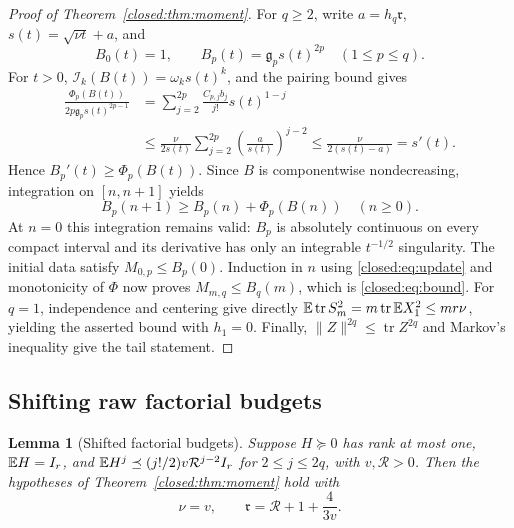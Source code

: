 \documentclass[11pt,a4paper]{article}
\newtheorem{lemma}[theorem]{Lemma}
\theoremstyle{definition}\newtheorem{definition}[theorem]{Definition}
\theoremstyle{remark}\newtheorem{remark}[theorem]{Remark}
\numberwithin{equation}{section}
\newcommand{\gmom}{\mathfrak g}
\newcommand{\Rmom}{\mathfrak r}
\DeclareMathOperator{\tr}{tr}\DeclareMathOperator{\rank}{rank}
\begin{document}
\begin{proof}[Proof of Theorem~\ref{closed:thm:moment}]
For $q\ge2$, write $a=h_q\Rmom$, $s(t)=\sqrt{\nu t}+a$, and
\[
 B_0(t)=1,\qquad B_p(t)=\gmom_ps(t)^{2p}\quad(1\le p\le q).
\]
For $t>0$, $\mathcal I_k(B(t))=\omega_ks(t)^k$, and the pairing
bound gives
\begin{align*}
 \frac{\Phi_p(B(t))}{2p\gmom_ps(t)^{2p-1}}
 &=\sum_{j=2}^{2p}\frac{C_{p,j}b_j}{j!}s(t)^{1-j}\\
 &\le\frac\nu{2s(t)}\sum_{j=2}^{2p}
                       \left(\frac a{s(t)}\right)^{j-2}
 \le\frac\nu{2(s(t)-a)}=s'(t).
\end{align*}
Hence $B_p'(t)\ge\Phi_p(B(t))$. Since $B$ is componentwise
nondecreasing, integration on $[n,n+1]$ yields
\[
 B_p(n+1)\ge B_p(n)+\Phi_p(B(n))\quad(n\ge0).
\]
At $n=0$ this integration remains valid: $B_p$ is absolutely
continuous on every compact interval and its derivative has only an
integrable $t^{-1/2}$ singularity. The initial data satisfy
$M_{0,p}\le B_p(0)$. Induction in $n$ using
\eqref{closed:eq:update} and monotonicity of $\Phi$ now proves
$M_{m,q}\le B_q(m)$, which is \eqref{closed:eq:bound}.
For $q=1$, independence and centering give directly
$\E\tr S_m^2=m\tr\E X_1^2\le mr\nu$, yielding the asserted
bound with $h_1=0$. Finally,
$\|Z\|^{2q}\le\tr Z^{2q}$ and Markov's inequality give the
tail statement.
\end{proof}
\subsection{Shifting raw factorial budgets}\label{appendix:shift}

\begin{lemma}[Shifted factorial budgets]\label{core:lem:shift}
Suppose $H\succeq0$ has rank at most one, $\mathbb E H=I_r$, and
$\mathbb E H^j\preceq(j!/2)v\mathcal R^{j-2}I_r$ for $2\le j\le2q$, with $v,\mathcal R>0$.
Then the hypotheses of Theorem~\ref{closed:thm:moment} hold with
\begin{equation}\label{core:eq:shift-parameters}
 \nu=v,\qquad\Rmom=\mathcal R+1+\frac4{3v}.
\end{equation}
\end{lemma}
\end{document}
